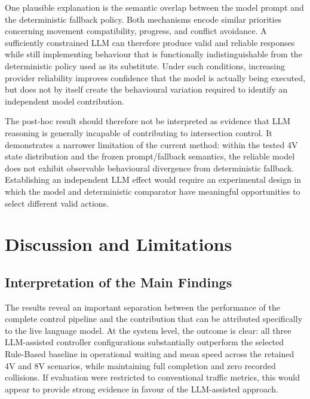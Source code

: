 \documentclass[letterpaper,10pt,conference]{ieeeconf}
\begin{document}
One plausible explanation is the semantic overlap between the model prompt and the deterministic fallback policy. Both mechanisms encode similar priorities concerning movement compatibility, progress, and conflict avoidance. A sufficiently constrained LLM can therefore produce valid and reliable responses while still implementing behaviour that is functionally indistinguishable from the deterministic policy used as its substitute. Under such conditions, increasing provider reliability improves confidence that the model is actually being executed, but does not by itself create the behavioural variation required to identify an independent model contribution.



The post-hoc result should therefore not be interpreted as evidence that LLM reasoning is generally incapable of contributing to intersection control. It demonstrates a narrower limitation of the current method: within the tested 4V state distribution and the frozen prompt/fallback semantics, the reliable model does not exhibit observable behavioural divergence from deterministic fallback. Establishing an independent LLM effect would require an experimental design in which the model and deterministic comparator have meaningful opportunities to select different valid actions.



\section{Discussion and Limitations}



\subsection{Interpretation of the Main Findings}



The results reveal an important separation between the performance of the complete control pipeline and the contribution that can be attributed specifically to the live language model. At the system level, the outcome is clear: all three LLM-assisted controller configurations substantially outperform the selected Rule-Based baseline in operational waiting and mean speed across the retained 4V and 8V scenarios, while maintaining full completion and zero recorded collisions. If evaluation were restricted to conventional traffic metrics, this would appear to provide strong evidence in favour of the LLM-assisted approach.
\end{document}

